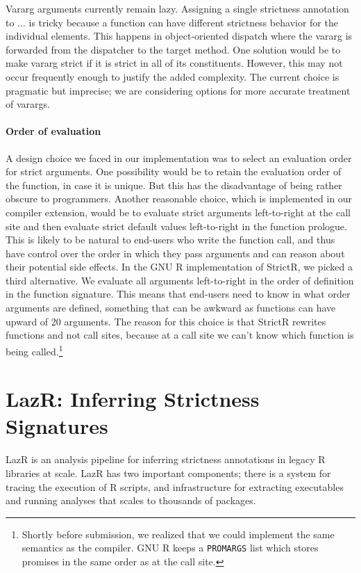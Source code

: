\documentclass[review,nonacm,screen,acmsmall,anonymous=true]{acmart}
\renewcommand{\c}[1]{\lstinline |#1|\xspace}
\newcommand{\strictr}{{\sf StrictR}\xspace}
\newcommand{\lazr}{{\sf LazR}\xspace}
\begin{document}
Vararg arguments currently remain lazy. Assigning a single strictness annotation
to $\dots$ is tricky because a function can have different strictness behavior
for the individual elements. This happens in object-oriented dispatch where the
vararg is forwarded from the dispatcher to the target method. One solution would
be to make vararg strict if it is strict in all of its constituents. However,
this may not occur frequently enough to justify the added complexity. The
current choice is pragmatic but imprecise; we are considering options for more
accurate treatment of varargs.


\paragraph{Order of evaluation} A design choice we faced in our implementation
was to select an evaluation order for strict arguments. One possibility would be
to retain the evaluation order of the function, in case it is unique. But this
has the disadvantage of being rather obscure to programmers. Another reasonable
choice, which is implemented in our compiler extension, would be to evaluate
strict arguments left-to-right at the call site and then evaluate strict default
values left-to-right in the function prologue. This is likely to be natural to
end-users who write the function call, and thus have control over the order in
which they pass arguments and can reason about their potential side effects. In
the GNU R implementation of \strictr, we picked a third alternative. We evaluate
all arguments left-to-right in the order of definition in the function
signature. This means that end-users need to know in what order arguments are
defined, something that can be awkward as functions can have upward of 20
arguments. The reason for this choice is that \strictr rewrites functions and
not call sites, because at a call site we can't know which function is being
called.\footnote{Shortly before submission, we realized that we could implement
  the same semantics as the compiler. GNU R keeps a \c{PROMARGS} list which
  stores promises in the same order as at the call site.}

\newpage%
\section{LazR: Inferring Strictness Signatures}\label{sec:lazr}

\lazr is an analysis pipeline for inferring strictness annotations in legacy R
libraries at scale. \lazr has two important components; there is a system for
tracing the execution of R scripts, and infrastructure for extracting
executables and running analyses that scales to thousands of packages.
\end{document}
